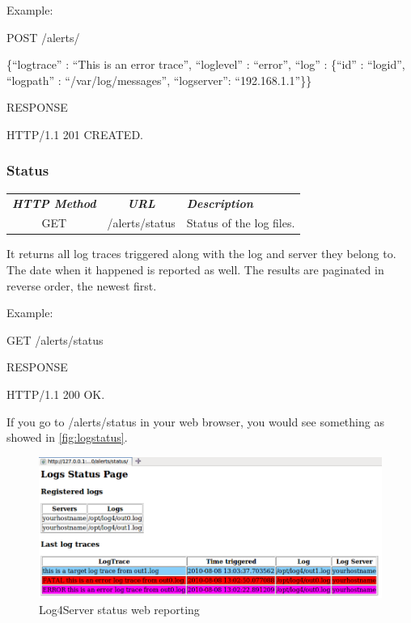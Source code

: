 \noindent
Example:

\begin{codeexample}

POST /alerts/

 \{``logtrace'' : ``This is an error trace'', 
   ``loglevel'' : ``error'',
   ``log'' : \{``id'' : ``logid'', ``logpath'' : ``/var/log/messages'', ``logserver'': 
``192.168.1.1''\}\} 

RESPONSE

HTTP/1.1 201 CREATED.
\end{codeexample}

\subsubsection{Status}

\begin{flushleft}
 \begin{tabular}{|c|c|l|}
 \hline 
 \rowcolor{cyan} {\color{white} \textit{\textbf{HTTP Method}}} &  {\color{white} 
  \textit{\textbf{URL}}}  & {\color{white} 
 \textit{\textbf{Description}}}\\
 GET & /alerts/status & Status of the log files.\\
 \hline
\end{tabular}
\end{flushleft}
It returns all log traces triggered along with the log and server they belong
to. The date when it happened is reported as well. The results are paginated in
reverse order, the newest first.

\noindent
Example:

\begin{codeexample}

GET /alerts/status

RESPONSE

HTTP/1.1 200 OK.
\end{codeexample}


\noindent
If you go to /alerts/status in your web browser, you would see something as
showed in  \autoref{fig:logstatus}.

\begin{figure}[ht]
\includegraphics[scale=0.50]{logstatus.png}
\caption{Log4Server status web reporting}\label{fig:logstatus}
\end{figure}

